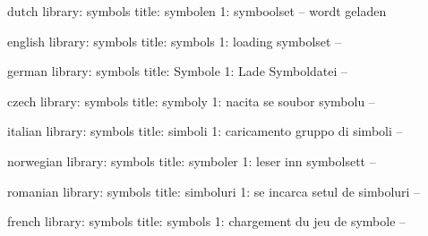 


\unprotect

\startmessages  dutch  library: symbols
  title: symbolen
      1: symboolset -- wordt geladen
\stopmessages

\startmessages  english  library: symbols
  title: symbols
      1: loading symbolset --
\stopmessages

\startmessages  german  library: symbols
  title: Symbole
      1: Lade Symboldatei --
\stopmessages

\startmessages  czech  library: symbols
  title: symboly
      1: nacita se soubor symbolu --
\stopmessages

\startmessages  italian  library: symbols
  title: simboli
      1: caricamento gruppo di simboli --
\stopmessages

\startmessages  norwegian  library: symbols
  title: symboler
      1: leser inn symbolsett --
\stopmessages

\startmessages  romanian  library: symbols
  title: simboluri
      1: se incarca setul de simboluri --
\stopmessages

\startmessages  french  library: symbols
  title: symbols
      1: chargement du jeu de symbole --
\stopmessages


